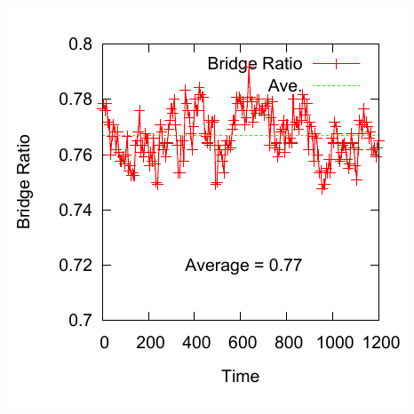 \documentclass[12pt, dvipdfmx]{beamer}
\begin{document}
\begin{frame}
\begin{columns}[T, totalwidth=\linewidth]
		\includegraphics[width=\columnwidth]{./fig/AB60/B_ratio.pdf}
\end{columns}

\end{frame}
\end{document}
